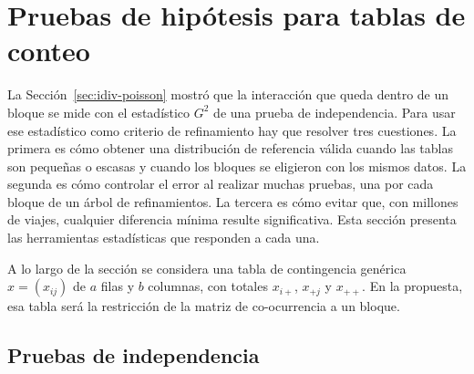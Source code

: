 
\section{Pruebas de hipótesis para tablas de conteo}\label{sec:pruebas}

La Sección~\ref{sec:idiv-poisson} mostró que la interacción que queda dentro de un
bloque se mide con el estadístico $G^2$ de una prueba de independencia. Para usar
ese estadístico como criterio de refinamiento hay que resolver tres cuestiones. La
primera es cómo obtener una distribución de referencia válida cuando las tablas
son pequeñas o escasas y cuando los bloques se eligieron con los mismos datos. La
segunda es cómo controlar el error al realizar muchas pruebas, una por cada bloque
de un árbol de refinamientos. La tercera es cómo evitar que, con millones de
viajes, cualquier diferencia mínima resulte significativa. Esta sección presenta
las herramientas estadísticas que responden a cada una.

A lo largo de la sección se considera una tabla de contingencia genérica
$x = (x_{ij})$ de $a$ filas y $b$ columnas, con totales $x_{i+}$, $x_{+j}$ y
$x_{++}$. En la propuesta, esa tabla será la restricción de la matriz de
co-ocurrencia a un bloque.

\subsection{Pruebas de independencia}\label{sec:est-independencia}

